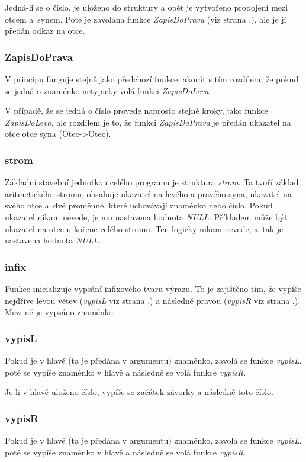 \documentclass[12pt,a4paper]{report}
\begin{document}
Jedná-li se o číslo, je uloženo do struktury a opět je vytvořeno propojení mezi otcem a~synem. Poté je zavolána funkce \textit{ZapisDoPrava} (viz strana \pageref{ZDP}.), ale je jí předán odkaz na otce. 
\newpage
\subsubsection{ZapisDoPrava} \label{ZDP}
V principu funguje stejně jako předchozí funkce, akorát s tím rozdílem, že pokud se jedná o znaménko netypicky volá funkci \textit{ZapisDoLeva}.  

V případě, že se jedná o číslo provede naprosto stejné kroky, jako funkce  \textit{ZapisDoLeva}, ale rozdílem je to, že funkci \textit{ZapisDoPrava} je předán ukazatel na otce otce syna (Otec->Otec).


\subsubsection{strom} \label{strom}
Základní stavební jednotkou celého programu je struktura \textit{strom}. Ta tvoří základ aritmetického stromu, obsahuje ukazatel na levého a pravého syna, ukazatel na svého otce a~dvě proměnné, které uchovávají znaménko nebo číslo. Pokud ukazatel nikam nevede, je mu nastavena hodnota \textit{NULL}. Příkladem může být ukazatel na otce u kořene celého stromu. Ten logicky nikam nevede, a~tak je nastavena hodnota \textit{NULL}. 

\subsubsection{infix} \label{infix}
Funkce inicializuje vypsání infixového tvaru výrazu. To je zajištěno tím, že vypíše nejdříve levou větev (\textit{vypisL} viz strana \pageref{vL}.) a následně pravou (\textit{vypisR} viz strana \pageref{vR}.). Mezi ně je vypsáno znaménko.

\subsubsection{vypisL} \label{vL}
Pokud je v hlavě (ta je předána v argumentu) znaménko, zavolá se funkce \textit{vypisL}, poté se vypíše znaménko v hlavě a následně se volá funkce \textit{vypisR}. 

Je-li v hlavě uloženo číslo, vypíše se začátek závorky a následně toto číslo. 

\subsubsection{vypisR} \label{vR}
Pokud je v hlavě (ta je předána v argumentu) znaménko, zavolá se funkce \textit{vypisL}, poté se vypíše znaménko v hlavě a následně se volá funkce \textit{vypisR}. 
\end{document}
